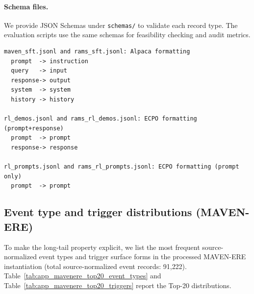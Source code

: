 \documentclass{article}
\begin{document}
\paragraph{Schema files.}
We provide JSON Schemas under \texttt{schemas/} to validate each record type. The evaluation scripts use the same schemas for feasibility checking and audit metrics.

\begin{lstlisting}[caption={SFT and RL-prompt formatting and column mapping (artifact metadata).},label={lst:format_mapping}]
maven_sft.jsonl and rams_sft.jsonl: Alpaca formatting
  prompt  -> instruction
  query   -> input
  response-> output
  system  -> system
  history -> history

rl_demos.jsonl and rams_rl_demos.jsonl: ECPO formatting (prompt+response)
  prompt  -> prompt
  response-> response

rl_prompts.jsonl and rams_rl_prompts.jsonl: ECPO formatting (prompt only)
  prompt  -> prompt

\end{lstlisting}

\subsection{Event type and trigger distributions (MAVEN-ERE)}
\label{sec:app_mavenere_dist}

To make the long-tail property explicit, we list the most frequent source-normalized event types and trigger surface forms in the processed MAVEN-ERE instantiation (total source-normalized event records: 91{,}222).
Table~\ref{tab:app_mavenere_top20_event_types} and Table~\ref{tab:app_mavenere_top20_triggers} report the Top-20 distributions.
\end{document}
